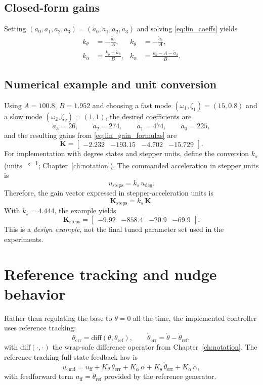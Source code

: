 \subsection{Closed-form gains}
Setting $(a_0,a_1,a_2,a_3)=(\tilde a_0,\tilde a_1,\tilde a_2,\tilde a_3)$ and solving \eqref{eq:lin_coeffs} yields
\begin{align}
k_{\theta} &= -\frac{\tilde a_0}{A}, &
k_{\dot{\theta}} &= -\frac{\tilde a_1}{A},\nonumber\\
k_{\dot{\alpha}} &= \frac{k_{\dot{\theta}}-\tilde a_3}{B}, &
k_{\alpha} &= \frac{k_{\theta}-A-\tilde a_2}{B}.
\label{eq:lin_gain_formulas}
\end{align}

\subsection{Numerical example and unit conversion}
Using $A=100.8$, $B=1.952$ and choosing a fast mode $(\omega_1,\zeta_1)=(15,0.8)$ and a slow mode $(\omega_2,\zeta_2)=(1,1)$, the desired coefficients are
\[
\tilde a_3=26,\qquad \tilde a_2=274,\qquad \tilde a_1=474,\qquad \tilde a_0=225,
\]
and the resulting gains from \eqref{eq:lin_gain_formulas} are
\[
\mathbf{K}=\begin{bmatrix}
-2.232 & -193.15 & -4.702 & -15.729
\end{bmatrix}.
\]
For implementation with degree states and stepper units, define the conversion $k_s$ (units \si{\step\per\degree}; Chapter~\ref{ch:notation}). The commanded acceleration in stepper units is
\[
u_{\mathrm{steps}} = k_s\,u_{\deg}.
\]
Therefore, the gain vector expressed in stepper-acceleration units is
\[
\mathbf{K}_{\mathrm{steps}} = k_s\,\mathbf{K}.
\]
With $k_s=4.444$, the example yields
\[
\mathbf{K}_{\mathrm{steps}}=
\begin{bmatrix}
-9.92 & -858.4 & -20.9 & -69.9
\end{bmatrix}.
\]
This is a \emph{design example}, not the final tuned parameter set used in the experiments.

\section{Reference tracking and nudge behavior}
Rather than regulating the base to $\theta=0$ all the time, the implemented controller uses reference tracking:
\[
\theta_{\mathrm{err}} = \mathrm{diff}(\theta,\theta_{\mathrm{ref}}),\qquad
\dot{\theta}_{\mathrm{err}} = \dot{\theta} - \dot{\theta}_{\mathrm{ref}},
\]
with $\mathrm{diff}(\cdot,\cdot)$ the wrap-safe difference operator from Chapter~\ref{ch:notation}. The reference-tracking full-state feedback law is
\begin{equation}
u_{\mathrm{cmd}} =
u_{\mathrm{ff}} +
K_\theta\,\theta_{\mathrm{err}} + K_\alpha\,\alpha +
K_{\dot{\theta}}\,\dot{\theta}_{\mathrm{err}} + K_{\dot{\alpha}}\,\dot{\alpha},
\label{eq:lin_ref_tracking}
\end{equation}
with feedforward term $u_{\mathrm{ff}}=\ddot{\theta}_{\mathrm{ref}}$ provided by the reference generator.

